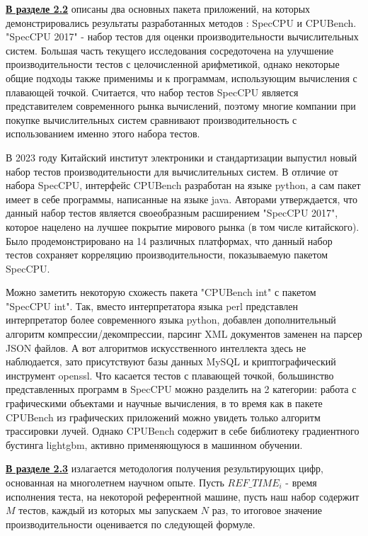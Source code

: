 \underline{\textbf{В разделе 2.2}} описаны два основных пакета приложений, на которых демонстрировались результаты разработанных методов : SpecCPU и CPUBench. "SpecCPU 2017"\phantom{} - набор тестов для оценки производительности вычислительных
систем. Большая часть текущего исследования сосредоточена
на улучшение производительности тестов с целочисленной арифметикой,
однако некоторые общие подходы также применимы и к программам, использующим
вычисления с плавающей точкой. Считается, что набор тестов
SpecCPU является представителем современного рынка вычислений, поэтому
многие компании при покупке вычислительных систем сравнивают производительность
с использованием именно этого набора тестов. 

В 2023 году Китайский институт электроники и стандартизации выпустил
новый набор тестов производительности для вычислительных систем.
В отличие от набора SpecCPU,  интерфейс CPUBench разработан на языке python, а сам пакет имеет в себе программы, написанные на языке java. Авторами утверждается, что данный набор
тестов является своеобразным расширением "SpecCPU 2017"\phantom{}, которое нацелено на
лучшее покрытие мирового рынка (в том числе китайского). Было продемонстрировано
на 14 различных платформах, что данный набор тестов сохраняет
корреляцию производительности, показываемую пакетом SpecCPU.

Можно заметить некоторую схожесть пакета "CPUBench int"\phantom{} с пакетом
"SpecCPU int"\phantom{}. Так, вместо интерпретатора языка perl представлен интерпретатор
более современного языка python, добавлен дополнительный алгоритм компрессии/декомпрессии, парсинг XML документов заменен на парсер JSON файлов.
А вот алгоритмов искусственного интеллекта здесь не наблюдается, зато присутствуют
базы данных MySQL и криптографический инструмент openssl.
Что касается тестов с плавающей точкой, большинство представленных
программ в SpecCPU можно разделить на 2 категории: работа с графическими
объектами и научные вычисления, в то время как в пакете CPUBench из графических
приложений можно увидеть только алгоритм трассировки лучей. Однако
CPUBench содержит в себе библиотеку градиентного бустинга lightgbm, активно
применяющуюся в машинном обучении.



\underline{\textbf{В разделе 2.3}} излагается методология получения результирующих цифр,
основанная на многолетнем научном опыте.
Пусть $REF\_TIME_i$ - время исполнения теста, на некоторой референтной машине, пусть наш набор содержит $M$ тестов, каждый из которых мы запускаем $N$ раз, то итоговое значение производительности оценивается по следующей формуле.

